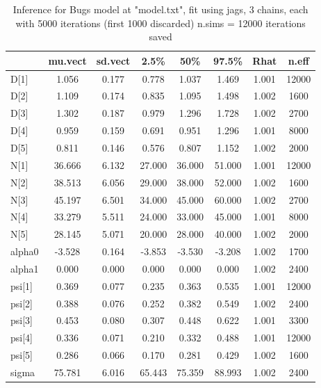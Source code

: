 \begin{table}[t!]
  \small
  \caption{Inference for Bugs model at "model.txt", fit using jags, 3 chains, each with 5000 iterations (first 1000 discarded)
    n.sims = 12000 iterations saved}
  \begin{tabular}[t]{lccccccc}
    \hline
       &  mu.vect &  sd.vect &  2.5\%  &  50\%  &  97.5\%  & Rhat &  n.eff \\
    \hline
D[1] &   1.056  &  0.177 &  0.778 &  1.037 &  1.469 &  1.001 & 12000 \\
D[2] &    1.109 &  0.174 &  0.835 &  1.095 &  1.498 &  1.002 &  1600 \\
D[3] &    1.302 &  0.187 &  0.979 &  1.296 &  1.728 &  1.002 &  2700 \\
D[4] &    0.959 &  0.159 &  0.691 &  0.951 &  1.296 &  1.001 &  8000 \\
D[5] &    0.811 &  0.146 &  0.576 &  0.807 &  1.152 & 1.002  &  2000 \\
N[1] &   36.666 &  6.132 &  27.000 &  36.000 &  51.000 &  1.001 &  12000 \\
N[2] &   38.513 &  6.056 & 29.000  &  38.000 &  52.000 & 1.002 &  1600 \\
N[3] &   45.197 &  6.501 & 34.000 &  45.000  &  60.000 &  1.002 & 2700 \\
N[4] &   33.279 &  5.511 & 24.000 &  33.000  &  45.000 &  1.001 &  8000 \\
N[5] &   28.145 &  5.071 &  20.000 &  28.000 &  40.000 &  1.002 &  2000 \\
alpha0 &  -3.528 &   0.164 & -3.853 &  -3.530 &  -3.208 &  1.002 &  1700 \\
alpha1 &  0.000 &  0.000 &  0.000 &  0.000 &  0.000 &  1.002 &  2400 \\
psi[1] &  0.369 &  0.077 &  0.235 &  0.363 &   0.535 &  1.001 &  12000 \\
psi[2] &  0.388 &  0.076 &  0.252 &  0.382 &  0.549 &  1.002 &  2400 \\
psi[3] &  0.453 &  0.080 &  0.307 &  0.448 &  0.622 &  1.001 &  3300 \\
psi[4] &  0.336 &  0.071 &  0.210 &  0.332 &  0.488 &  1.001 &  12000 \\
psi[5] &  0.286 &  0.066 &  0.170 &  0.281 &  0.429 &  1.002  &  1600 \\
sigma  &  75.781 &  6.016 &  65.443 &  75.359 &  88.993 &  1.002 &  2400 \\
\hline
  \end{tabular}
  \label{scrovenbird.results}
\end {table}


